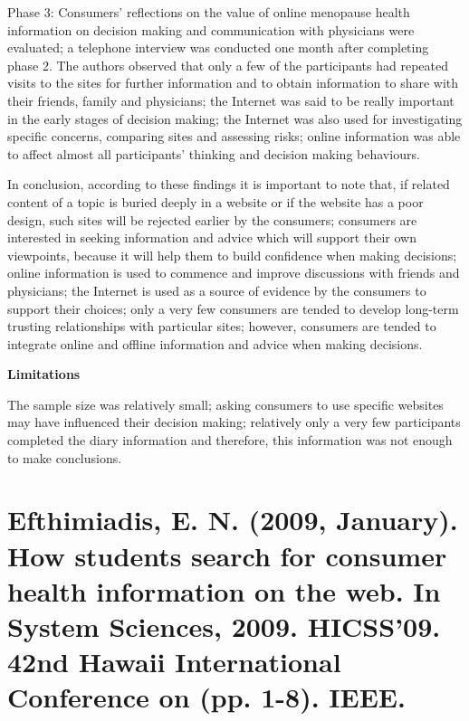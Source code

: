 \documentclass[]{article}
\begin{document}
Phase 3: Consumers' reflections on the value of online menopause health information on decision making and communication with physicians were evaluated; a telephone interview was conducted one month after completing phase 2. The authors observed that only a few of the participants had repeated visits to the sites for further information and to obtain information to share with their friends, family and physicians; the Internet was said to be really important in the early stages of decision making; the Internet was also used for investigating specific concerns, comparing sites and assessing risks; online information was able to affect almost all participants' thinking and decision making behaviours.                     

In conclusion, according to these findings it is important to note that, if related content of a topic is buried deeply in a website or if the website has a poor design, such sites will be rejected earlier by the consumers;  consumers are interested in seeking information and advice which will support their own viewpoints, because it will help them to build confidence when making decisions; online information is used to commence and improve discussions with friends and physicians; the Internet is used as a source of evidence by the consumers to support their choices; only a very few consumers are tended to develop long-term trusting relationships with particular sites; however, consumers are tended to integrate online and offline information and advice when making decisions.     

\textbf{Limitations}

The sample size was relatively small; asking consumers to use specific websites may have influenced their decision making; relatively only a very few participants completed the diary information and therefore, this information was not enough to make conclusions.  


\section{Efthimiadis, E. N. (2009, January). How students search for consumer health information on the web. In System Sciences, 2009. HICSS'09. 42nd Hawaii International Conference on (pp. 1-8). IEEE.}
\end{document}
